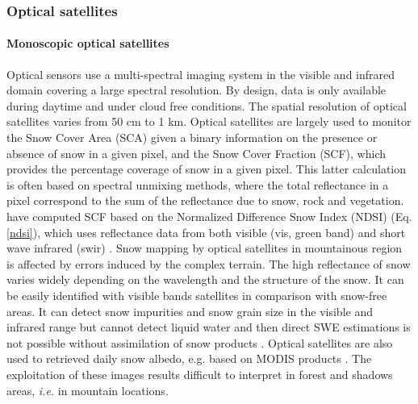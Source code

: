 \documentclass[hydrology,article,submit,moreauthors,pdftex]{Definitions/mdpi}
\begin{document}
\subsubsection{Optical satellites} %

\paragraph{Monoscopic optical satellites}
Optical sensors use a multi-spectral imaging system in the visible and infrared domain covering a large spectral resolution. By design, data is only available during daytime and under cloud free conditions. The spatial resolution of optical satellites varies from 50 cm to 1 km.%
Optical satellites are largely used to monitor the Snow Cover Area (SCA) given a binary information on the presence or absence of snow in a given pixel, and the Snow Cover Fraction (SCF), which provides the percentage coverage of snow in a given pixel. This latter calculation is often based on spectral unmixing methods, where the total reflectance in a pixel correspond to the sum of the reflectance due to snow, rock and vegetation. %
\citet{Hall_1995} have computed SCF based on the Normalized Difference Snow Index (NDSI) (Eq. \ref{ndsi}), which uses reflectance data from both visible (vis, green band) and short wave infrared (swir) \citep{Sirguey_2009}. Snow mapping by optical satellites in mountainous region is affected by errors induced by the complex terrain. The high reflectance of snow varies widely depending on the wavelength and the structure of the snow. It can be easily identified with visible bands satellites in comparison with snow-free areas. It can detect snow impurities and snow grain size in the visible and infrared range but cannot detect liquid water and then direct SWE estimations is not possible without assimilation of snow products \citep{Mary_2013}. Optical satellites are also used to retrieved daily snow albedo, e.g. based on MODIS products \citep{Klein_2002}. The exploitation of these images results difficult to interpret in forest and shadows areas, \textit{i.e.} in mountain locations.
\end{document}
